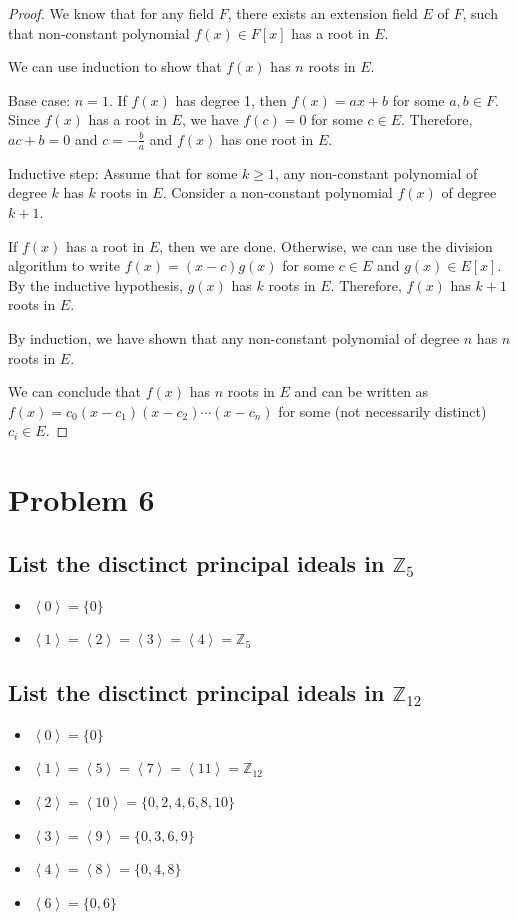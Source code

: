 \documentclass{article}
\theoremstyle{plain} %
\theoremstyle{definition} %
\begin{document}
\begin{proof}
    We know that for any field $F$, there exists an extension field $E$ of $F$, such 
    that non-constant polynomial $f(x) \in F[x]$ has a root in $E$.

    We can use induction to show that $f(x)$ has $n$ roots in $E$.

    Base case: $n = 1$.
    If $f(x)$ has degree 1, then $f(x) = ax + b$ for some $a, b \in F$.
    Since $f(x)$ has a root in $E$, we have $f(c) = 0$ for some $c \in E$.
    Therefore, $ac + b = 0$ and $c = -\frac{b}{a}$ and $f(x)$ has one root in $E$.

    Inductive step: Assume that for some $k \geq 1$, any non-constant polynomial of degree $k$ has $k$ roots in $E$.
    Consider a non-constant polynomial $f(x)$ of degree $k+1$.

    If $f(x)$ has a root in $E$, then we are done.
    Otherwise, we can use the division algorithm to write $f(x) = (x-c)g(x)$ for some $c \in E$ and $g(x) \in E[x]$.
    By the inductive hypothesis, $g(x)$ has $k$ roots in $E$.
    Therefore, $f(x)$ has $k+1$ roots in $E$.

    By induction, we have shown that any non-constant polynomial of degree $n$ has $n$ roots in $E$.

    We can conclude that $f(x)$ has $n$ roots in $E$ and can be written as $f(x) = c_0(x-c_1)(x-c_2)\cdots (x-c_n)$ for some (not necessarily distinct) $c_i \in E$.
\end{proof}

\section*{Problem 6}
\subsection*{List the disctinct principal ideals
in $\mathbb{Z}_5$}
\begin{itemize}
    \item $\left<0\right> = \{0\}$
    \item $\left<1\right> = \left<2\right> = \left<3\right> = \left<4\right> = \mathbb{Z}_5$
\end{itemize}

\subsection*{List the disctinct principal ideals
in $\mathbb{Z}_{12}$}
\begin{itemize}
    \item $\left<0\right> = \{0\}$
    \item $\left<1\right> = \left<5\right> = \left<7\right> = \left<11\right> = \mathbb{Z}_{12}$
    \item $\left<2\right> = \left<10\right> = \{0, 2, 4, 6, 8, 10\}$
    \item $\left<3\right> = \left<9\right> = \{0, 3, 6, 9\}$
    \item $\left<4\right> = \left<8\right> = \{0, 4, 8\}$
    \item $\left<6\right> = \{0, 6\}$
\end{itemize}
\end{document}
